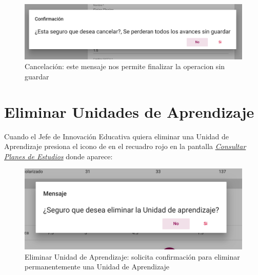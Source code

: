 \begin{figure}[!hbtp]
    \centering
    \hypertarget{cancelarE}{\includegraphics[width=0.7\linewidth]{images/GUA/cancelar}}
    \caption{Cancelación: este mensaje nos permite finalizar la operacion sin guardar}
    \label{cancelarE}
\end{figure}
\newpage
\section{Eliminar Unidades de Aprendizaje}
Cuando el Jefe de Innovación Educativa quiera eliminar una Unidad de Aprendizaje presiona el icono de  en el recuadro rojo en la pantalla \hyperlink{consultarUA}{\textit{Consultar Planes de Estudios}} donde aparece:\\
\begin{figure}[!hbtp]
    \centering
    \hypertarget{EliminarUA}{\includegraphics[width=0.7\linewidth]{images/GUA/EliminarUA}}
    \caption{Eliminar Unidad de Aprendizaje: solicita confirmación para eliminar permanentemente una Unidad de Aprendizaje}
    \label{EliminarUA}
\end{figure}